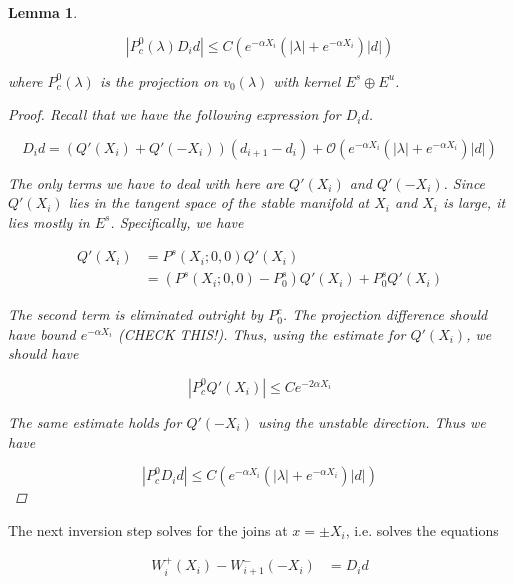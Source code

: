 \documentclass[12pt]{article}
\newtheorem{lemma}{Lemma}
\begin{document}
\begin{lemma}\label{P0cDid}

\begin{equation}
|P^0_c(\lambda) D_i d| \leq C \left( e^{-\alpha X_i} \left( |\lambda| +  e^{-\alpha X_i}  \right) |d| \right)
\end{equation}

where $P^0_c(\lambda)$ is the projection on $v_0(\lambda)$ with kernel $E^s \oplus E^u$.

\begin{proof}
Recall that we have the following expression for $D_i d$.

\[
D_i d = ( Q'(X_i) + Q'(-X_i))(d_{i+1} - d_i ) + \mathcal{O} \left( e^{-\alpha X_i} \left( |\lambda| +  e^{-\alpha X_i}  \right) |d| \right)
\]

The only terms we have to deal with here are $Q'(X_i)$ and $Q'(-X_i)$. Since $Q'(X_i)$ lies in the tangent space of the stable manifold at $X_i$ and $X_i$ is large, it lies mostly in $E^s$. Specifically, we have

\begin{align*}
Q'(X_i) &= P^s(X_i; 0, 0) Q'(X_i) \\
&= (P^s(X_i; 0, 0) - P^s_0) Q'(X_i) + P^s_0 Q'(X_i)
\end{align*}

The second term is eliminated outright by $P^c_0$. The projection difference should have bound $e^{-\alpha X_i}$ (CHECK THIS!). Thus, using the estimate for $Q'(X_i)$, we should have

\[
| P^0_c Q'(X_i)| \leq C e^{-2 \alpha X_i}
\]

The same estimate holds for $Q'(-X_i)$ using the unstable direction. Thus we have

\[
|P^0_c D_i d| \leq C \left( e^{-\alpha X_i} \left( |\lambda| +  e^{-\alpha X_i}  \right) |d| \right)
\]

\end{proof}
\end{lemma}

The next inversion step solves for the joins at $x = \pm X_i$, i.e. solves the equations

\begin{align*}
W_i^+(X_i) - W_{i+1}^-(-X_i) &= D_i d \\
\end{align*}

\end{document}
